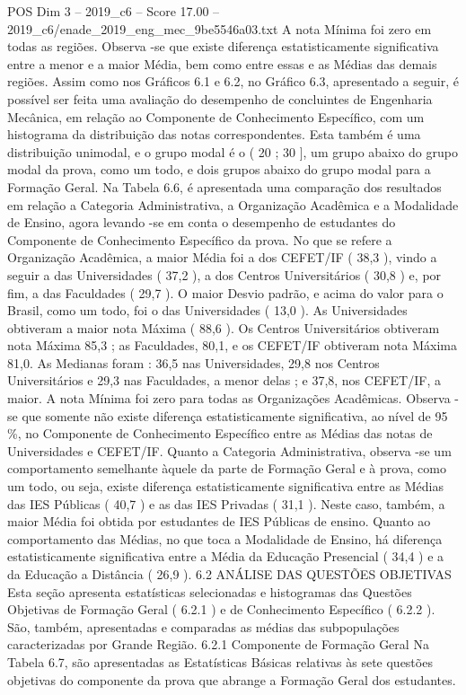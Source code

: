 \begin{textsample}{POS Dim 3 – 2019\_c6 – Score 17.00 – 2019\_c6/enade\_2019\_eng\_mec\_9be5546a03.txt}
A nota Mínima foi zero em todas as regiões.
Observa -se que existe diferença estatisticamente significativa entre a menor e a maior Média, bem como entre essas e as Médias das demais regiões.
Assim como nos Gráficos 6.1 e 6.2, no Gráfico 6.3, apresentado a seguir, é possível ser feita uma avaliação do desempenho de concluintes de Engenharia Mecânica, em relação ao Componente de Conhecimento Específico, com um histograma da distribuição das notas correspondentes.
Esta também é uma distribuição unimodal, e o grupo modal é o ( 20 ; 30 ], um grupo abaixo do grupo modal da prova, como um todo, e dois grupos abaixo do grupo modal para a Formação Geral.
Na Tabela 6.6, é apresentada uma comparação dos resultados em relação a Categoria Administrativa, a Organização Acadêmica e a Modalidade de Ensino, agora levando -se em conta o desempenho de estudantes do Componente de Conhecimento Específico da prova.
No que se refere a Organização Acadêmica, a maior Média foi a dos CEFET/IF ( 38,3 ), vindo a seguir a das Universidades ( 37,2 ), a dos Centros Universitários ( 30,8 ) e, por fim, a das Faculdades ( 29,7 ).
O maior Desvio padrão, e acima do valor para o Brasil, como um todo, foi o das Universidades ( 13,0 ).
As Universidades obtiveram a maior nota Máxima ( 88,6 ).
Os Centros Universitários obtiveram nota Máxima 85,3 ; as Faculdades, 80,1, e os CEFET/IF obtiveram nota Máxima 81,0.
As Medianas foram : 36,5 nas Universidades, 29,8 nos Centros Universitários e 29,3 nas Faculdades, a menor delas ; e 37,8, nos CEFET/IF, a maior.
A nota Mínima foi zero para todas as Organizações Acadêmicas.
Observa -se que somente não existe diferença estatisticamente significativa, ao nível de 95 \%, no Componente de Conhecimento Específico entre as Médias das notas de Universidades e CEFET/IF.
Quanto a Categoria Administrativa, observa -se um comportamento semelhante àquele da parte de Formação Geral e à prova, como um todo, ou seja, existe diferença estatisticamente significativa entre as Médias das IES Públicas ( 40,7 ) e as das IES Privadas ( 31,1 ).
Neste caso, também, a maior Média foi obtida por estudantes de IES Públicas de ensino.
Quanto ao comportamento das Médias, no que toca a Modalidade de Ensino, há diferença estatisticamente significativa entre a Média da Educação Presencial ( 34,4 ) e a da Educação a Distância ( 26,9 ). 6.2 ANÁLISE DAS QUESTÕES OBJETIVAS Esta seção apresenta estatísticas selecionadas e histogramas das Questões Objetivas de Formação Geral ( 6.2.1 ) e de Conhecimento Específico ( 6.2.2 ).
São, também, apresentadas e comparadas as médias das subpopulações caracterizadas por Grande Região. 6.2.1 Componente de Formação Geral Na Tabela 6.7, são apresentadas as Estatísticas Básicas relativas às sete questões objetivas do componente da prova que abrange a Formação Geral dos estudantes.

\end{textsample}

